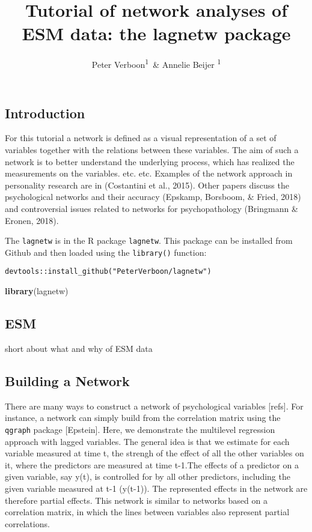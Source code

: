 \documentclass[man,floatsintext]{apa6}
\title{Tutorial of network analyses of ESM data: the lagnetw package}
\author{Peter Verboon\textsuperscript{1}~\& Annelie Beijer \textsuperscript{1 }}
\date{}
\affiliation{
\vspace{0.5cm}
\textsuperscript{1} Open University}
\newenvironment{Shaded}{\begin{snugshade}}{\end{snugshade}}
\newcommand{\KeywordTok}[1]{\textcolor[rgb]{0.13,0.29,0.53}{\textbf{#1}}}
\newcommand{\NormalTok}[1]{#1}
\theoremstyle{definition}
\theoremstyle{definition}
\theoremstyle{definition}
\theoremstyle{remark}
\begin{document}
\maketitle

\subsection{Introduction}\label{introduction}

For this tutorial a network is defined as a visual representation of a
set of variables together with the relations between these variables.
The aim of such a network is to better understand the underlying
process, which has realized the measurements on the variables. etc. etc.
Examples of the network approach in personality research are in
(Costantini et al., 2015). Other papers discuss the psychological
networks and their accuracy (Epskamp, Borsboom, \& Fried, 2018) and
controversial issues related to networks for psychopathology (Bringmann
\& Eronen, 2018).

The \texttt{lagnetw} is in the R package \texttt{lagnetw}. This package
can be installed from Github and then loaded using the
\texttt{library()} function:

\texttt{devtools::install\_github("PeterVerboon/lagnetw")}

\begin{Shaded}
\begin{Highlighting}[]
\KeywordTok{library}\NormalTok{(lagnetw)}
\end{Highlighting}
\end{Shaded}

\subsection{ESM}\label{esm}

short about what and why of ESM data

\subsection{Building a Network}\label{building-a-network}

There are many ways to construct a network of psychological variables
{[}refs{]}. For instance, a network can simply build from the
correlation matrix using the \texttt{qgraph} package {[}Epstein{]}.
Here, we demonstrate the multilevel regression approach with lagged
variables. The general idea is that we estimate for each variable
measured at time t, the strengh of the effect of all the other variables
on it, where the predictors are measured at time t-1.The effects of a
predictor on a given variable, say y(t), is controlled for by all other
predictors, including the given variable measured at t-1 (y(t-1)). The
represented effects in the network are therefore partial effects. This
network is similar to networks based on a correlation matrix, in which
the lines between variables also represent partial correlations.
\end{document}
